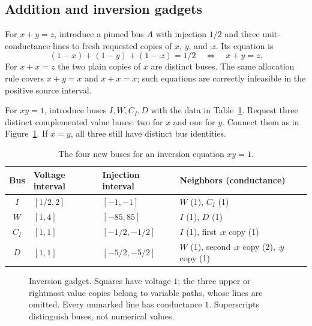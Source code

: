 \subsection{Addition and inversion gadgets}

For $x+y=z$, introduce a pinned bus $A$ with injection $1/2$ and three
unit-conductance lines to fresh requested copies of $x$, $y$, and
$\comp{z}$. Its equation is
\[
 (1-x)+(1-y)+(1-\comp{z})=1/2
 \quad\Longleftrightarrow\quad x+y=z.
\]
For $x+x=z$ the two plain copies of $x$ are distinct buses. The same allocation
rule covers $x+y=x$ and $x+x=x$; such equations are correctly infeasible in
the positive source interval.

For $xy=1$, introduce buses $I,W,C_I,D$ with the data in
Table~\ref{tab:inversion}. Request three distinct complemented value buses:
two for $x$ and one for $y$. Connect them as in Figure~\ref{fig:inversion}.
If $x=y$, all three still have distinct bus identities.

\begin{table}[htbp]
\centering
\begin{tabular}{@{}clll@{}}
\toprule
Bus & Voltage interval & Injection interval & Neighbors (conductance)\\
\midrule
$I$ & $[1/2,2]$ & $[-1,-1]$ & $W$ (1), $C_I$ (1)\\
$W$ & $[1,4]$ & $[-85,85]$ & $I$ (1), $D$ (1)\\
$C_I$ & $[1,1]$ & $[-1/2,-1/2]$ & $I$ (1), first $\comp{x}$ copy (1)\\
$D$ & $[1,1]$ & $[-5/2,-5/2]$ & $W$ (1), second $\comp{x}$ copy (2), $\comp{y}$ copy (1)\\
\bottomrule
\end{tabular}
\caption{The four new buses for an inversion equation $xy=1$.}
\label{tab:inversion}
\end{table}

\begin{figure}[htbp]
\centering
{}
\caption{Inversion gadget. Squares have voltage $1$; the three upper or
rightmost value copies belong to variable paths, whose lines are omitted.
Every unmarked line has conductance $1$. Superscripts distinguish buses,
not numerical values.}
\label{fig:inversion}
\end{figure}

